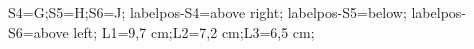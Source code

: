\documentclass[exercice]{thedocument}%
\begin{document}
%
\>S4=G;\>S5=H;\>S6=J;%
\>labelpos-S4=above right;%
\>labelpos-S5=below;%
\>labelpos-S6=above left;%
\>L1=9,7 cm;\>L2=7,2 cm;\>L3=6,5 cm;%
%
\end{document}
